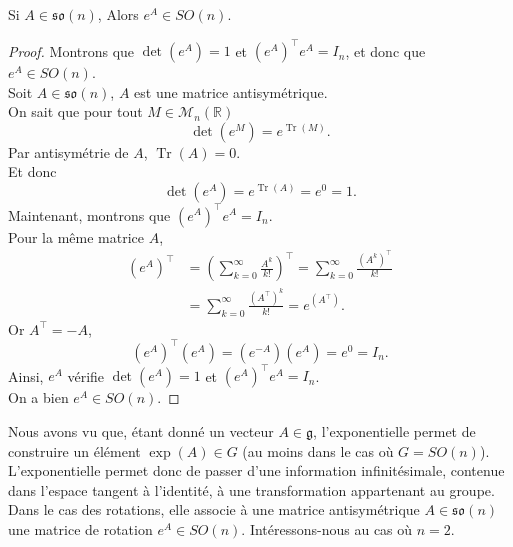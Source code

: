 \documentclass[12pt]{report}
\begin{document}
\begin{proposition}\label{prop:ensemble-exp}
Si $A\in\mathfrak{so}(n)$, Alors $e^A\in SO(n)$.
\end{proposition}

\begin{proof}
Montrons que $\det(e^A)=1$ et ${(e^A)}^{\top}e^A=I_n$, et donc que $e^A\in SO(n)$.\\
Soit $A\in \mathfrak{so}(n)$, $A$ est une matrice antisymétrique.\\
On sait que pour tout $M\in \mathcal{M}_n(\mathbb{R})$
\[
\det(e^M)=e^{\operatorname{Tr}(M)}.
\]
Par antisymétrie de $A$, $\operatorname{Tr}(A)=0$.\\
Et donc
\[
\det(e^A)=e^{\operatorname{Tr}(A)}=e^0=1.
\]
Maintenant, montrons que ${(e^A)}^{\top}e^A=I_n$.\\
Pour la même matrice $A$,
\[
\begin{aligned}
{(e^A)}^{\top}&={\left( \sum_{k=0}^{\infty}\frac{A^k}{k!}\right)}^{\top}=\sum_{k=0}^{\infty}\frac{{(A^k)}^{\top}}{k!}\\
&=\sum_{k=0}^{\infty}\frac{{({A}^{\top})}^k}{k!}=e^{(A^{\top})}.
\end{aligned}
\]
Or $A^{\top}=-A$,
\[
{(e^A)}^{\top}(e^A)=(e^{-A})(e^A)=e^0=I_n.
\]
Ainsi, $e^A$ vérifie $\det(e^A)=1$ et ${(e^A)}^{\top}e^A=I_n$.\\
On a bien \underline{$e^A\in SO(n)$}.
\end{proof}

Nous avons vu que, étant donné un vecteur $A\in\mathfrak{g}$, l'exponentielle permet de construire un élément $\exp(A)\in G$ (au moins dans le cas où $G=SO(n)$). L'exponentielle permet donc de passer d'une information infinitésimale, contenue dans l'espace tangent à l'identité, à une transformation appartenant au groupe. Dans le cas des rotations, elle associe à une matrice antisymétrique $A\in\mathfrak{so}(n)$ une matrice de rotation $e^A\in SO(n)$. Intéressons-nous au cas où $n=2$.
\end{document}
